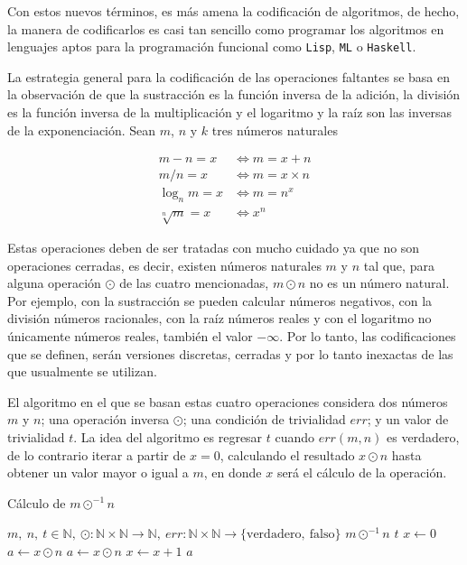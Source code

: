 Con estos nuevos términos, es más amena la codificación de algoritmos, de hecho, la manera de codificarlos es casi tan sencillo como programar los algoritmos en lenguajes aptos para la programación funcional como \texttt{Lisp}, \texttt{ML} o \texttt{Haskell}.

La estrategia general para la codificación de las operaciones faltantes se basa en la observación de que la sustracción es la función inversa de la adición, la división es la función inversa de la multiplicación y el logaritmo y la raíz son las inversas de la exponenciación. Sean \( m \), \( n \) y \( k \) tres números naturales

\begin{align*}
  m-n = x &\iff m = x+n \\
  m/n = x &\iff m = x\times n\\
  \log_{n}m = x &\iff m = n^{x} \\
  \sqrt[n]m = x &\iff x^{n}
\end{align*}

Estas operaciones deben de ser tratadas con mucho cuidado ya que no son operaciones cerradas, es decir, existen números naturales \( m \) y \( n \) tal que, para alguna operación \( \odot \) de las cuatro mencionadas, \( m \odot n \) no es un número natural. Por ejemplo, con la sustracción se pueden calcular números negativos, con la división números racionales, con la raíz números reales y con el logaritmo no únicamente números reales, también el valor \( -\infty \). Por lo tanto, las codificaciones que se definen, serán versiones discretas, cerradas y por lo tanto inexactas de las que usualmente se utilizan.

El algoritmo en el que se basan estas cuatro operaciones considera dos números \( m \) y \( n \); una operación inversa \( \odot \); una condición de trivialidad \( err \); y un valor de trivialidad \( t \). La idea del algoritmo es regresar \( t \) cuando \( err(m,n) \) es verdadero, de lo contrario iterar a partir de \( x = 0 \), calculando el resultado \( x \odot n \) hasta obtener un valor mayor o igual a \( m \), en donde \( x \) será el cálculo de la operación.

\begin{algorithm}
  \caption{Cálculo de \( m \odot^{-1} n \)}
  \label{alg:inversas}
  \begin{algorithmic}
    \REQUIRE \( m,\ n,\ t \in \mathbb{N},\ \odot \colon \mathbb{N} \times \mathbb{N} \to \mathbb{N},\ err \colon \mathbb{N} \times \mathbb{N} \to \{ \mathrm{verdadero},\ \mathrm{falso} \} \)
    \ENSURE \( m \odot^{-1} n \)
    \RETURN \( t \)
    \ELSE
    \STATE \( x \leftarrow 0 \)
    \STATE \( a \leftarrow x \odot n \)
    \STATE \( a \leftarrow x \odot n \)
    \STATE \( x \leftarrow x + 1 \)
    \ENDWHILE
    \RETURN \( a \)
    \ENDIF
  \end{algorithmic}
\end{algorithm}


